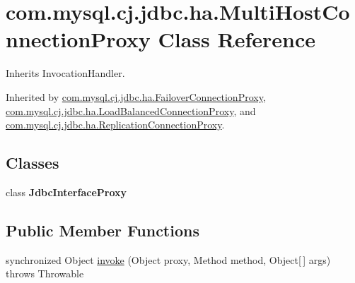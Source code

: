 \hypertarget{classcom_1_1mysql_1_1cj_1_1jdbc_1_1ha_1_1_multi_host_connection_proxy}{}\section{com.\+mysql.\+cj.\+jdbc.\+ha.\+Multi\+Host\+Connection\+Proxy Class Reference}
\label{classcom_1_1mysql_1_1cj_1_1jdbc_1_1ha_1_1_multi_host_connection_proxy}


Inherits Invocation\+Handler.



Inherited by \mbox{\hyperlink{classcom_1_1mysql_1_1cj_1_1jdbc_1_1ha_1_1_failover_connection_proxy}{com.\+mysql.\+cj.\+jdbc.\+ha.\+Failover\+Connection\+Proxy}}, \mbox{\hyperlink{classcom_1_1mysql_1_1cj_1_1jdbc_1_1ha_1_1_load_balanced_connection_proxy}{com.\+mysql.\+cj.\+jdbc.\+ha.\+Load\+Balanced\+Connection\+Proxy}}, and \mbox{\hyperlink{classcom_1_1mysql_1_1cj_1_1jdbc_1_1ha_1_1_replication_connection_proxy}{com.\+mysql.\+cj.\+jdbc.\+ha.\+Replication\+Connection\+Proxy}}.

\subsection*{Classes}
\begin{DoxyCompactItemize}
\item 
class {\bfseries Jdbc\+Interface\+Proxy}
\end{DoxyCompactItemize}
\subsection*{Public Member Functions}
\begin{DoxyCompactItemize}
\item 
synchronized Object \mbox{\hyperlink{classcom_1_1mysql_1_1cj_1_1jdbc_1_1ha_1_1_multi_host_connection_proxy_a1d1665c05d34a4382e804e44d4788084}{invoke}} (Object proxy, Method method, Object\mbox{[}$\,$\mbox{]} args)  throws Throwable 
\end{DoxyCompactItemize}
